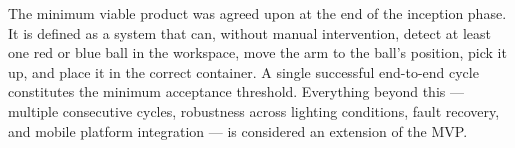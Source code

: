 \label{sec:mvp}

The minimum viable product was agreed upon at the end of the inception phase. It
is defined as a system that can, without manual intervention, detect at least one
red or blue ball in the workspace, move the arm to the ball's position, pick it
up, and place it in the correct container. A single successful end-to-end cycle
constitutes the minimum acceptance threshold. Everything beyond this --- multiple
consecutive cycles, robustness across lighting conditions, fault recovery, and
mobile platform integration --- is considered an extension of the MVP.
